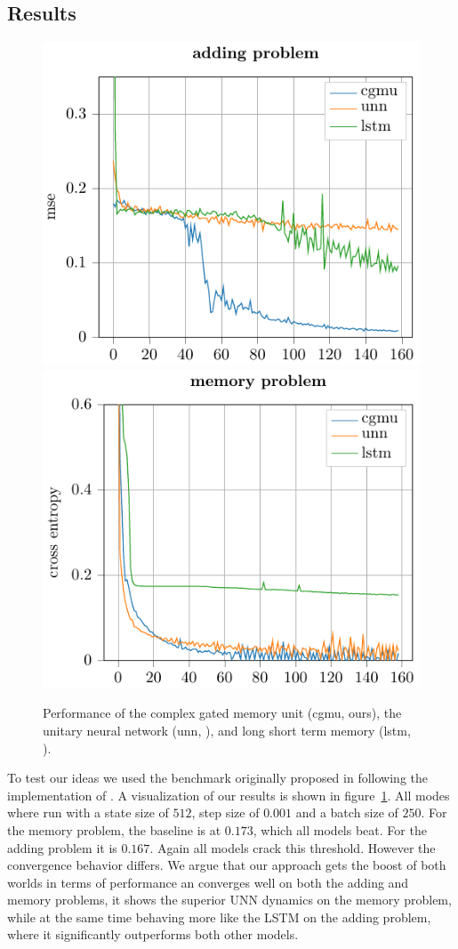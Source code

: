 \documentclass{article}
\begin{document}
\subsection{Results}
\begin{figure}
\centering
%
\includegraphics[width=0.45\linewidth]{./img/cgmu/adding_problem.pdf}
%
\includegraphics[width=0.45\linewidth]{./img/cgmu/memory_problem.pdf}
\caption{Performance of the complex gated memory unit (cgmu, ours), the unitary neural network (unn, \cite{Arjovsky}), and long short term memory (lstm, \cite{Hochreiter}).}
\label{fig:montreal_eval}
\end{figure}
To test our ideas we used the benchmark originally proposed in \cite{Hochreiter} following the implementation of \cite{Arjovsky}. A visualization of our results is shown in figure~\ref{fig:montreal_eval}. All modes where run with a state size of $512$, step size of $0.001$ and a batch size of $250$. For the memory problem, the baseline is at $0.173$, which all models beat. For the adding problem it is $0.167$. Again all models crack this threshold. However the convergence behavior differs. We argue that our approach gets the boost of both worlds in terms of performance an converges well on both the adding and memory problems, it shows the superior UNN dynamics on the memory problem, while at the same time behaving more like the LSTM on the adding problem, where it significantly outperforms both other models.
\end{document}
